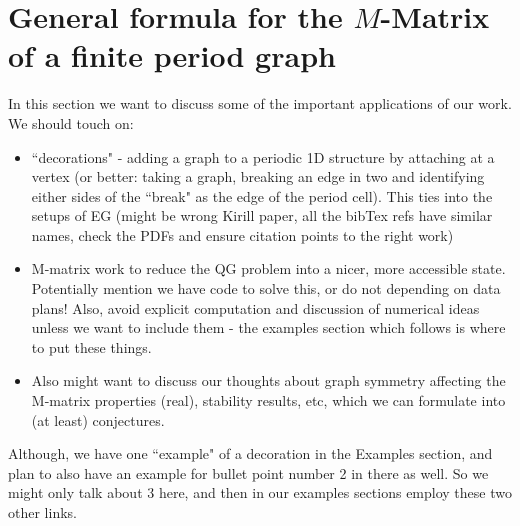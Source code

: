 \section{General formula for the $M$-Matrix of a finite period graph} \label{sec:Discussion}
In this section we want to discuss some of the important applications of our work.
We should touch on:
\begin{itemize}
	\item ``decorations" - adding a graph to a periodic 1D structure by attaching at a vertex (or better: taking a graph, breaking an edge in two and identifying either sides of the ``break" as the edge of the period cell).
	This ties into the setups of EG \cite{cherednichenko2019time} (might be wrong Kirill paper, all the bibTex refs have similar names, check the PDFs and ensure citation points to the right work)
	\item M-matrix work to reduce the QG problem into a nicer, more accessible state.
	Potentially mention we have code to solve this, or do not depending on data plans!
	Also, avoid explicit computation and discussion of numerical ideas unless we want to include them - the examples section which follows is where to put these things.
	\item Also might want to discuss our thoughts about graph symmetry affecting the M-matrix properties (real), stability results, etc, which we can formulate into (at least) conjectures.
\end{itemize}
Although, we have one ``example" of a decoration in the Examples section, and plan to also have an example for bullet point number 2 in there as well. So we might only talk about 3 here, and then in our examples sections employ these two other links.

